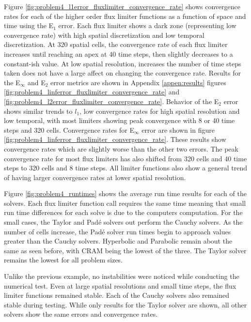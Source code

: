 Figure \ref{fig:problem4_l1error_fluxlimiter_convergence_rate} shows convergence rates for each of the higher order flux limiter functions as a function of space and time using the E${}_{1}$ error. Each flux limiter shows a dark zone (representing low convergence rate) with high spatial discretization and low temporal discretization. At 320 spatial cells, the convergence rate of each flux limiter increases until reaching an apex at 40 time steps, then slightly decreases to a constant-ish value. At low spatial resolution, increases the number of time steps taken does not have a large affect on changing the convergence rate. Results for the E${}_{\infty}$ and E${}_{2}$ error metrics are shown in Appendix \ref{appen:results} figures \ref{fig:problem4_linferror_fluxlimiter_convergence_rate} and \ref{fig:problem4_l2error_fluxlimiter_convergence_rate}. Behavior of the E${}_{2}$ error shows similar trends to $l_{1}$, low convergence rates for high spatial resolution and low temporal, with most limiters showing peak convergence with 8 or 40 time steps and 320 cells. Convergence rates for E${}_{\infty}$ error are shown in figure \ref{fig:problem4_linferror_fluxlimiter_convergence_rate}. These results show convergence rates which are slightly worse than the other two errors. The peak convergence rate for most flux limiters has also shifted from 320 cells and 40 time steps to 320 cells and 8 time steps. All limiter functions also show a general trend of having larger convergence rates at lower spatial resolution. 

Figure \ref{fig:problem4_runtimes} shows the average run time results for each of the solvers. Each flux limiter function call requires the same time meaning that small run time differences for each solve is due to the computers computation. For the small cases, the Taylor and Pad\'e solvers out perform the Cauchy solvers. As the number of cells increase, the Pad\'e solver run times begin to approach values greater than the Cauchy solvers. Hyperbolic and Parabolic remain about the same as seen before, with CRAM being the lowest of the three. The Taylor solver remains the lowest for all problem sizes. 

Unlike the previous example, no instabilities were noticed while conducting the numerical test. Even at large spatial resolutions and small time steps, the flux limiter functions remained stable. Each of the Cauchy solvers also remained stable during testing. While only results for the Taylor solver are shown, all other solvers show the same errors and convergence rates.

